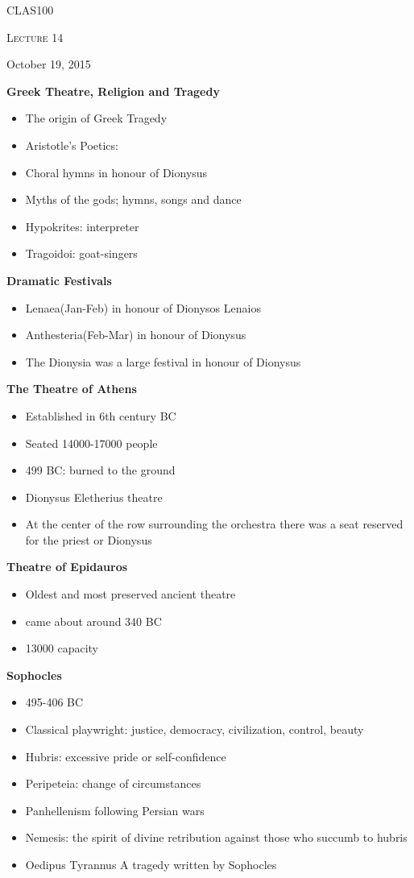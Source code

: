 \documentclass[12pt,a4paper]{report}
\begin{document}
	\centering
	{\scshape\LARGE CLAS100\par}
	{\scshape\Large Lecture 14\par}
	{\large October 19, 2015}
	\vspace{1.5cm}
	
\textbf{Greek Theatre, Religion and Tragedy}
\begin{itemize}
\item The origin of Greek Tragedy
\item Aristotle's Poetics:
\item Choral hymns in honour of Dionysus
\item Myths of the gods; hymns, songs and dance
\item Hypokrites: interpreter
\item Tragoidoi: goat-singers
\end{itemize}

\textbf{Dramatic Festivals}
\begin{itemize}
\item Lenaea(Jan-Feb) in honour of Dionysos Lenaios
\item Anthesteria(Feb-Mar) in honour of Dionysus
\item The Dionysia was a large festival in honour of Dionysus
\end{itemize}

\textbf{The Theatre of Athens}
\begin{itemize}
\item Established in 6th century BC
\item Seated 14000-17000 people
\item 499 BC: burned to the ground
\item Dionysus Eletherius theatre
\item At the center of the row surrounding the orchestra there was a seat reserved for the priest or Dionysus
\end{itemize}

\textbf{Theatre of Epidauros}
\begin{itemize}
\item Oldest and most preserved ancient theatre
\item came about around 340 BC
\item 13000 capacity
\end{itemize}

\textbf{Sophocles}
\begin{itemize}
\item 495-406 BC
\item Classical playwright: justice, democracy, civilization, control, beauty
\item Hubris: excessive pride or self-confidence
\item Peripeteia: change of circumstances
\item Panhellenism following Persian wars
\item Nemesis: the spirit of divine retribution against those who succumb to hubris
\item Oedipus Tyrannus A tragedy written by Sophocles
\end{itemize}
\end{document}
